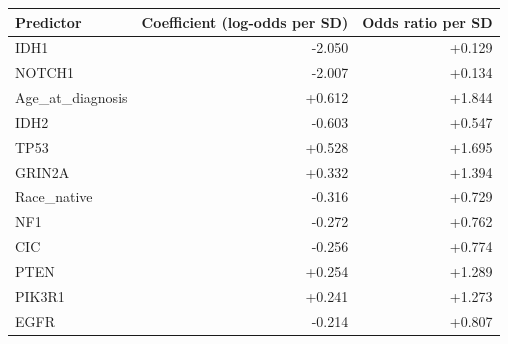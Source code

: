 \begin{tabular}{lrr}
\toprule
\textbf{Predictor} & \textbf{Coefficient (log-odds per SD)} & \textbf{Odds ratio per SD} \\
\midrule
IDH1 & -2.050 & +0.129 \\
NOTCH1 & -2.007 & +0.134 \\
Age\_at\_diagnosis & +0.612 & +1.844 \\
IDH2 & -0.603 & +0.547 \\
TP53 & +0.528 & +1.695 \\
GRIN2A & +0.332 & +1.394 \\
Race\_native & -0.316 & +0.729 \\
NF1 & -0.272 & +0.762 \\
CIC & -0.256 & +0.774 \\
PTEN & +0.254 & +1.289 \\
PIK3R1 & +0.241 & +1.273 \\
EGFR & -0.214 & +0.807 \\
\bottomrule
\end{tabular}
